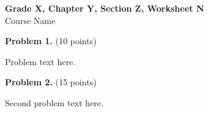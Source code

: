 \documentclass[11pt,a4paper]{article}
\newenvironment{problem}[2][10]
{\vspace{3mm}\noindent\textbf{Problem #2.} (#1 points)\par}
{\vspace{5mm}}
\begin{document}
\begin{center}
\Large\textbf{Grade X, Chapter Y, Section Z, Worksheet N}\\
\vspace{2mm}
\large Course Name
\end{center}

\begin{problem}{1}
Problem text here.
\end{problem}

\begin{problem}[15]{2}
Second problem text here.
\vspace{2cm}
\end{problem}
\end{document}
